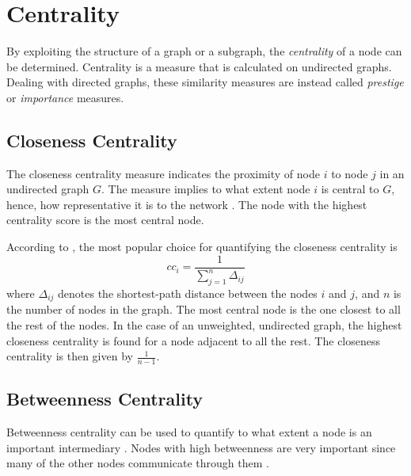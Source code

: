 \section{Centrality}
By exploiting the structure of a graph or a subgraph, the \textit{centrality} of a node can be determined. Centrality is a measure that is calculated on undirected graphs. Dealing with directed graphs, these similarity measures are instead called \textit{prestige} or \textit{importance} measures. \cite{fouss2016algorithms}

\subsection{Closeness Centrality}
The closeness centrality measure indicates the proximity of node $i$ to node $j$ in an undirected graph $G$. The measure implies to what extent node $i$ is central to $G$, hence, how representative it is to the network \citep{fouss2016algorithms}. The node with the highest centrality score is the most central node.

According to \citet{fouss2016algorithms}, the most popular choice for quantifying the closeness centrality is
\begin{equation}
    cc_i=\frac{1}{\sum_{j=1}^{n} \Delta_{ij}}
\end{equation}
where $\Delta_{ij}$ denotes the shortest-path distance between the nodes $i$ and $j$, and $n$ is the number of nodes in the graph. The most central node is the one closest to all the rest of the nodes. In the case of an unweighted, undirected graph, the highest closeness centrality is found for a node adjacent to all the rest. The closeness centrality is then given by $\frac{1}{n-1}$.

\subsection{Betweenness Centrality}
Betweenness centrality can be used to quantify to what extent a node is an important intermediary \citep{fouss2016algorithms}. Nodes with high betweenness are very important since many of the other nodes communicate through them \citep{Kajdanowicz2013}. 

